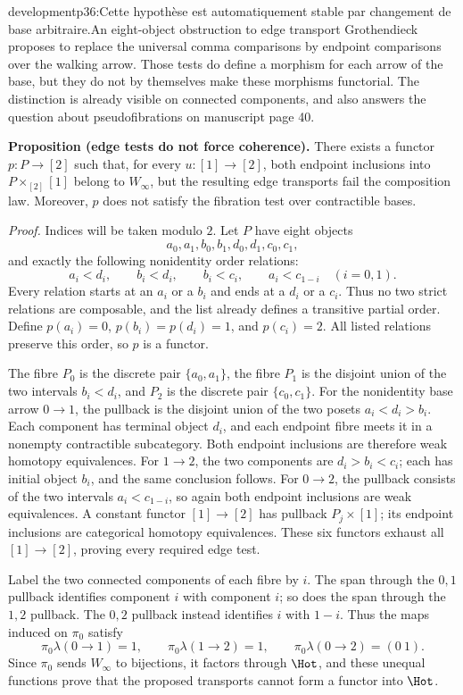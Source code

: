 \begin{dcomment}{development}{p36:Cette hypothèse est automatiquement stable par changement de base arbitraire.}{An eight-object obstruction to edge transport}
Grothendieck proposes to replace the universal comma comparisons by endpoint comparisons over the walking arrow. Those tests do define a morphism for each arrow of the base, but they do not by themselves make these morphisms functorial. The distinction is already visible on connected components, and also answers the question about pseudofibrations on manuscript page 40.

\textbf{Proposition (edge tests do not force coherence).}\ours
There exists a functor $p:P\to[2]$ such that, for every $u:[1]\to[2]$, both endpoint inclusions into $P\times_{[2]}[1]$ belong to $W_\infty$, but the resulting edge transports fail the composition law. Moreover, $p$ does not satisfy the fibration test over contractible bases.

\emph{Proof.} Indices will be taken modulo $2$. Let $P$ have eight objects
\[
 a_0,a_1,b_0,b_1,d_0,d_1,c_0,c_1,
\]
and exactly the following nonidentity order relations:
\[
 a_i<d_i,\qquad b_i<d_i,\qquad
 b_i<c_i,\qquad a_i<c_{1-i}\quad(i=0,1).
\]
Every relation starts at an $a_i$ or a $b_i$ and ends at a $d_i$ or a $c_i$. Thus no two strict relations are composable, and the list already defines a transitive partial order. Define $p(a_i)=0$, $p(b_i)=p(d_i)=1$, and $p(c_i)=2$. All listed relations preserve this order, so $p$ is a functor.

The fibre $P_0$ is the discrete pair $\{a_0,a_1\}$, the fibre $P_1$ is the disjoint union of the two intervals $b_i<d_i$, and $P_2$ is the discrete pair $\{c_0,c_1\}$. For the nonidentity base arrow $0\to1$, the pullback is the disjoint union of the two posets $a_i<d_i>b_i$. Each component has terminal object $d_i$, and each endpoint fibre meets it in a nonempty contractible subcategory. Both endpoint inclusions are therefore weak homotopy equivalences. For $1\to2$, the two components are $d_i>b_i<c_i$; each has initial object $b_i$, and the same conclusion follows. For $0\to2$, the pullback consists of the two intervals $a_i<c_{1-i}$, so again both endpoint inclusions are weak equivalences. A constant functor $[1]\to[2]$ has pullback $P_j\times[1]$; its endpoint inclusions are categorical homotopy equivalences. These six functors exhaust all $[1]\to[2]$, proving every required edge test.

Label the two connected components of each fibre by $i$. The span through the $0,1$ pullback identifies component $i$ with component $i$; so does the span through the $1,2$ pullback. The $0,2$ pullback instead identifies $i$ with $1-i$. Thus the maps induced on $\pi_0$ satisfy
\[
 \pi_0\lambda(0\to1)=1,\qquad
 \pi_0\lambda(1\to2)=1,\qquad
 \pi_0\lambda(0\to2)=(0\ 1).
\]
Since $\pi_0$ sends $W_\infty$ to bijections, it factors through $\Hot$, and these unequal functions prove that the proposed transports cannot form a functor into $\Hot$.


\end{dcomment}
